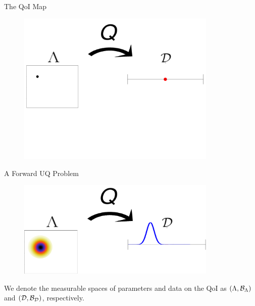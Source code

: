 \begin{frame}{The QoI Map}
{\begin{figure}[h]
	\includegraphics[width=0.85\textwidth]{./figures/threelevels/schematic_lambda_data_level1.pdf}
\end{figure}

}

\end{frame}

\begin{frame}{A Forward UQ Problem}

\begin{figure}[h]
	\includegraphics[width=0.85\textwidth]{./figures/threelevels/schematic_lambda_data_level3.pdf}
\end{figure}

{We denote the measurable spaces of parameters and data on the QoI as $({\Lambda},\mathcal{B}_{{\Lambda}})$ and $(\mathcal{D},\mathcal{B}_{\mathcal{D}})$, respectively.}
\bigskip


\end{frame}

